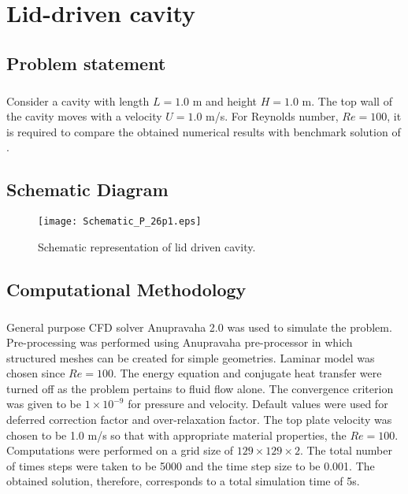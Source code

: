 
\chapter{Lid-driven cavity}

\section{Problem statement}

  \paragraph*{}
Consider a cavity with length $L= 1.0$ m and height $H = 1.0$ m.  The top wall of the cavity moves with a velocity $U = 1.0$ m/s. For  Reynolds number, $Re = 100$, it is required to compare the obtained numerical results with benchmark solution of \cite{Ghia1982}. 

\section{Schematic  Diagram}

\begin{figure}[htb!]
	\centering
	\hspace*{2cm}
     \texttt{[image: Schematic\_P\_26p1.eps]}
     \caption{Schematic representation of lid driven cavity.}
     \label{fig:schematicDgm_LDC}
\end{figure}


\section{Computational Methodology}

   \paragraph*{}
General purpose CFD solver Anupravaha 2.0 was used to simulate the problem. Pre-processing was performed using Anupravaha pre-processor in which structured meshes can be created for simple geometries. Laminar model was chosen since $Re = 100.$ The energy equation and conjugate heat transfer were turned off as the problem pertains to fluid flow alone. The convergence criterion was given to be $1\times 10^{-9}$ for pressure and velocity. Default values were used for deferred correction factor and over-relaxation factor. The top plate velocity was chosen to be 1.0 m/s so that with appropriate material properties, the $Re = 100$. Computations were performed on a grid size of  $129\times129\times2$. The total number of times steps were taken to be 5000 and the time step size to be 0.001.  The obtained solution, therefore, corresponds to a total simulation time of 5s.
\vspace*{0.5cm}
